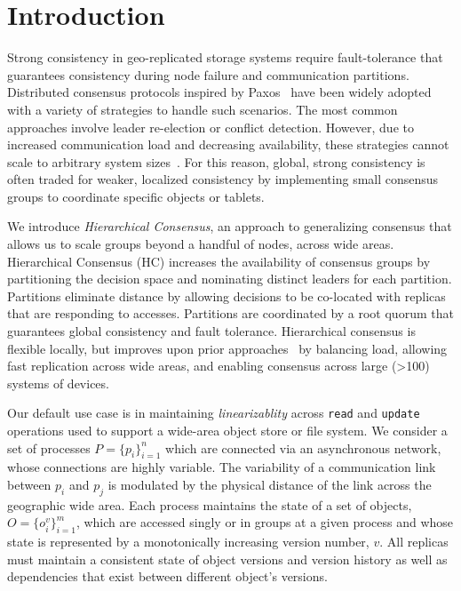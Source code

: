\documentclass[sigconf]{acmart}
\begin{document}


\maketitle

\section{Introduction}

Strong consistency in geo-replicated storage systems require fault-tolerance that
guarantees consistency during node failure and communication partitions.
Distributed consensus protocols inspired by Paxos~\cite{lamport_paxos_2001} have been
widely adopted with a variety of strategies to handle such scenarios.
The most common approaches involve leader re-election or conflict detection.
However, due to increased communication load and decreasing availability, these
strategies cannot scale to arbitrary system sizes~\cite{2016arXiv160806696H}.
For this reason, global, strong consistency is often traded for weaker, localized
consistency by implementing small consensus groups to coordinate specific objects or
tablets.

We introduce \emph{Hierarchical Consensus}, an approach to generalizing
consensus that allows us to scale groups beyond a handful of nodes, across
wide areas.
Hierarchical Consensus (HC) increases the availability of consensus groups by
partitioning the decision space and nominating distinct leaders for each
partition.
Partitions eliminate distance by allowing decisions to be co-located with
replicas that are responding to accesses.
Partitions are coordinated by a root quorum that guarantees global consistency and fault
tolerance.
Hierarchical consensus is flexible locally, but improves upon prior
approaches~\cite{biely_s-paxos:_2012,mao_mencius:_2008,moraru_there_2013,kraska_mdcc:_2013}
by balancing load, allowing fast replication across wide areas, and enabling
consensus across large (\textgreater 100) systems of devices.

Our default use case is in maintaining \emph{linearizablity} across
\texttt{read} and \texttt{update} operations used to support a wide-area
object store or file system.
We consider a set of processes $P = \{p_i\}_{i=1}^n$ which are connected via
an asynchronous network, whose connections are highly variable.
The variability of a communication link between $p_i$ and $p_j$ is modulated
by the physical distance of the link across the geographic wide area.
Each process maintains the state of a set of objects, $O = \{o_i^v\}_{i=1}^m$,
which are accessed singly or in groups at a given process and whose state is
represented by a monotonically increasing version number, $v$.
All replicas must maintain a consistent state of object versions and version history as
well as dependencies that exist between different object's versions.
\end{document}
